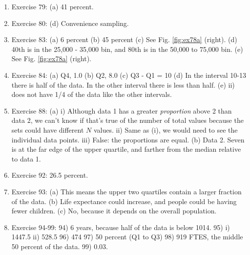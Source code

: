 \documentclass{article}
\begin{document}
\begin{enumerate}
\begin{figure}[hb]
\end{figure}
\item Exercise 79: (a) 41 percent.
\item Exercise 80: (d) Convenience sampling.
\item Exercise 83: (a) 6 percent (b) 45 percent (c) See Fig. \ref{fig:ex78a} (right). (d) 40th is in the 25,000 - 35,000 bin, and 80th is in the 50,000 to 75,000 bin. (e) See Fig. \ref{fig:ex78a} (right).
\item Exercise 84: (a) Q4, 1.0 (b) Q2, 8.0 (c) Q3 - Q1	 = 10 (d) In the interval 10-13 there is half of the data.  In the other interval there is less than half. (e) ii) does not have 1/4 of the data like the other intervals.
\item Exercise 88: (a) i) Although data 1 has a greater \textit{proportion} above 2 than data 2, we can't know if that's true of the number of total values because the sets could have different $N$ values. ii) Same as (i), we would need to see the individual data points. iii) False: the proportions are equal. (b) Data 2.  Seven is at the far edge of the upper quartile, and farther from the median relative to data 1.
\item Exercise 92: 26.5 percent.
\item Exercise 93: (a) This means the upper two quartiles contain a larger fraction of the data. (b) Life expectance could increase, and people could be having fewer children. (c) No, because it depends on the overall population.
\item Exercise 94-99: 94) 6 years, because half of the data is below 1014. 95) i) 1447.5 ii) 528.5 96) 474 97) 50 percent (Q1 to Q3) 98) 919 FTES, the middle 50 percent of the data. 99) 0.03.
\end{enumerate}
\end{document}
